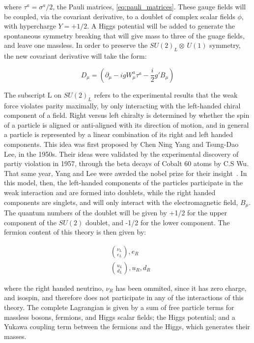 \noindent where $\tau^{a} = \sigma^{a}/2$, the Pauli matrices,
\ref{eq:pauli_matrices}.  These gauge fields will be coupled, via the
covariant derivative, to a doublet of complex scalar fields $\phi$,
with hypercharge $Y=+1/2$.  A Higgs potential will be added to 
generate the spontaneous symmetry breaking that will give mass to
three of the guage fields, and leave one massless.  In order to
preserve the $SU(2)_{L}\otimes~U(1)$ symmetry, the new covariant 
derivative will take the form:

\begin{equation}\label{eq:ewk_covariant_derivative}
D_{\mu} = (\partial_{\mu} - igW_{\mu}^{a}\tau^{a} -
\frac{i}{2}g'B_{\mu})
\end{equation}

\par The subscript L on $SU(2)_{L}$ refers to the experimental
results that the weak force violates parity maximally, by only
interacting with the left-handed chiral component of a field.  Right
versus left chiralty is determined by whether the spin of a particle
is aligned or anti-aligned with its direction of motion, and in
general a particle is represented by a linear combination of its right and
left handed components.  This idea was first proposed by Chen Ning
Yang and Tsung-Dao Lee, in the 1950s.  Their ideas were validated by
the experimental discovery of partiy violation in 1957, through the beta decays of Cobalt
60 atoms by C.S Wu.  That same year, Yang and Lee were awrded the
nobel prize for their insight~\cite{th:YangLee_NobelPrize}.  In this
model, then, the left-handed components of the particles participate
in the weak interaction and are formed into doublets, while the right handed
components are singlets, and will only interact with the
electromagnetic field, $B_{\mu}$.  The quantum numbers of the doublet
will be given by +1/2 for the upper component of the $SU(2)$ doublet,
and -1/2 for the lower component.  The fermion content of this theory
is then given by:

\begin{equation}\label{eq:ewk_fermion_doublets}
\begin{aligned}
&\binom{\nu_{L}}{e_{L}}, e_{R} \\
&\binom{u_{L}}{d_{L}}, u_{R}, d_{R} 
\end{aligned}
\end{equation}

\noindent where the right handed neutrino, $\nu_{R}$ has been ommited,
since it has zero charge, and isospin, and therefore does not
participate in any of the interactions of this theory.  The complete
Lagrangian is given by a sum of free particle terms for  massless bosons,
fermions, and Higgs scalar fields; the Higgs potential; and a Yukawa
coupling term between the fermions and the Higgs, which generates
their masses. 

